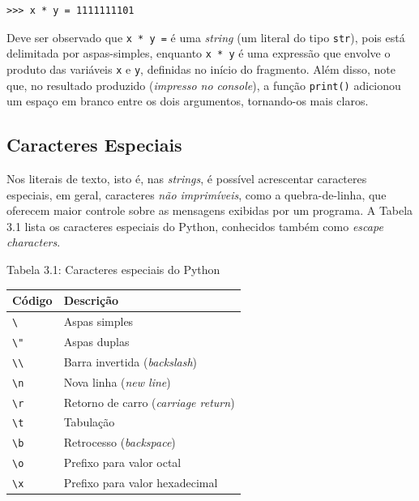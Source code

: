 \documentclass[
]{book}
\begin{document}
\begin{verbatim}
>>> x * y = 1111111101
\end{verbatim}

Deve ser observado que \texttt{\textquotesingle{}x\ *\ y\ =\textquotesingle{}} é uma \emph{string} (um literal do tipo \texttt{str}), pois está delimitada por aspas-simples, enquanto \texttt{x\ *\ y} é uma expressão que envolve o produto das variáveis \texttt{x} e \texttt{y}, definidas no início do fragmento. Além disso, note que, no resultado produzido (\emph{impresso no console}), a função \texttt{print()} adicionou um espaço em branco entre os dois argumentos, tornando-os mais claros.

\hypertarget{e-s-saida-escap}{%
\subsection{Caracteres Especiais}\label{e-s-saida-escap}}

Nos literais de texto, isto é, nas \emph{strings}, é possível acrescentar caracteres especiais, em geral, caracteres \emph{não imprimíveis}, como a quebra-de-linha, que oferecem maior controle sobre as mensagens exibidas por um programa. A Tabela 3.1 lista os caracteres especiais do Python, conhecidos também como \emph{escape characters}.

Tabela 3.1: Caracteres especiais do Python

\begin{longtable}[]{@{}ll@{}}
\toprule
Código & Descrição \\
\midrule
\endhead
\texttt{\textbackslash{}\textquotesingle{}} & Aspas simples \\
\texttt{\textbackslash{}"} & Aspas duplas \\
\texttt{\textbackslash{}\textbackslash{}} & Barra invertida (\emph{backslash}) \\
\texttt{\textbackslash{}n} & Nova linha (\emph{new line}) \\
\texttt{\textbackslash{}r} & Retorno de carro (\emph{carriage return}) \\
\texttt{\textbackslash{}t} & Tabulação \\
\texttt{\textbackslash{}b} & Retrocesso (\emph{backspace}) \\
\texttt{\textbackslash{}o} & Prefixo para valor octal \\
\texttt{\textbackslash{}x} & Prefixo para valor hexadecimal \\
\bottomrule
\end{longtable}
\end{document}

